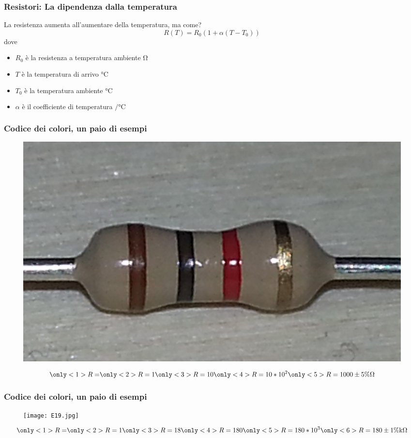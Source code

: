 		\begin{frame}[c]\frametitle{Resistori: La dipendenza dalla temperatura}
		    
			La resistenza aumenta all'aumentare della temperatura, ma come?
			\[
			R(T) = R_0 \left(1 + \alpha \left(T - T_0\right)\right)
			\]
			dove
			\begin{itemize}
				\item $R_0$ è la resistenza a temperatura ambiente $\si{\ohm}$
				\item $T$ è la temperatura di arrivo $\si{\celsius}$
				\item $T_0$ è la temperatura ambiente $\si{\celsius}$
				\item $\alpha$ è il coefficiente di temperatura $\si{\per\celsius}$
			\end{itemize}
		
		\end{frame}
		
		\begin{frame}[c]\frametitle{Codice dei colori, un paio di esempi}
		    \begin{figure}[tb]
		    	\centering
		    	\includegraphics[width= 5 cm] {./img/E12.jpg}
		    	\label{fig:resistore_E12}
		    \end{figure}
			\[
			\only<1> {R =}
			\only<2> {R = 1 }
			\only<3> {R = 10}
			\only<4> {R = 10*10^{2}}
			\only<5> {R = 1000  \pm 5\% \si{\ohm}}
			\]
		\end{frame}

		\begin{frame}[c]\frametitle{Codice dei colori, un paio di esempi}
			\begin{figure}[tb]
				\centering
				\texttt{[image: E19.jpg]}			
				\label{fig:resistore_E19}
			\end{figure}
			\[
			\only<1> {R =}
			\only<2> {R = 1 }
			\only<3> {R = 18}
			\only<4> {R = 180}
			\only<5> {R = 180*10^{3}}
			\only<6> {R = 180  \pm 1\% \si{\kilo\ohm}}
			\]
		\end{frame}

